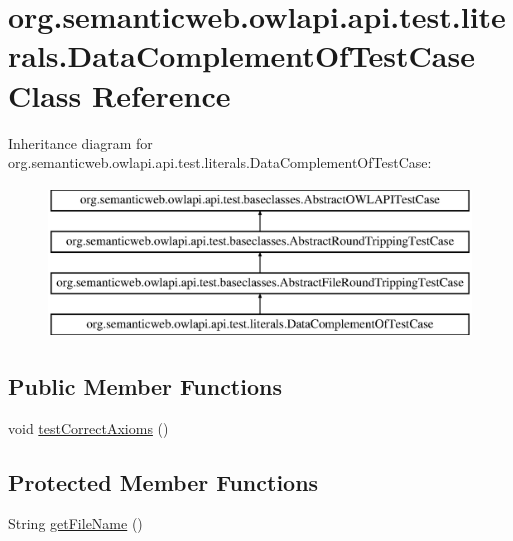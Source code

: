 \hypertarget{classorg_1_1semanticweb_1_1owlapi_1_1api_1_1test_1_1literals_1_1_data_complement_of_test_case}{\section{org.\-semanticweb.\-owlapi.\-api.\-test.\-literals.\-Data\-Complement\-Of\-Test\-Case Class Reference}
\label{classorg_1_1semanticweb_1_1owlapi_1_1api_1_1test_1_1literals_1_1_data_complement_of_test_case}
}
Inheritance diagram for org.\-semanticweb.\-owlapi.\-api.\-test.\-literals.\-Data\-Complement\-Of\-Test\-Case\-:\begin{figure}[H]
\begin{center}
\leavevmode
\includegraphics[height=4.000000cm]{classorg_1_1semanticweb_1_1owlapi_1_1api_1_1test_1_1literals_1_1_data_complement_of_test_case}
\end{center}
\end{figure}
\subsection*{Public Member Functions}
\begin{DoxyCompactItemize}
\item 
void \hyperlink{classorg_1_1semanticweb_1_1owlapi_1_1api_1_1test_1_1literals_1_1_data_complement_of_test_case_a5b93393e1f7698a434ebfbadf3733bff}{test\-Correct\-Axioms} ()
\end{DoxyCompactItemize}
\subsection*{Protected Member Functions}
\begin{DoxyCompactItemize}
\item 
String \hyperlink{classorg_1_1semanticweb_1_1owlapi_1_1api_1_1test_1_1literals_1_1_data_complement_of_test_case_adfb15956f795d23c2f6fa3a6a19bc217}{get\-File\-Name} ()
\end{DoxyCompactItemize}


